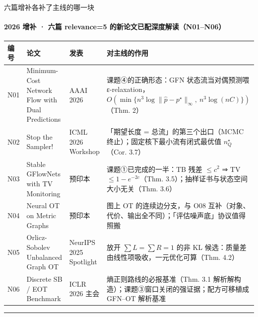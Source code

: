 \documentclass[aspectratio=169,10pt]{beamer}
\newcommand{\pos}[1]{\textcolor{positive}{#1}}
\newcommand{\con}[1]{\textcolor{negative}{#1}}
\begin{document}
\begin{frame}{六篇增补各补了主线的哪一块}\framesubtitle{2026 增补 · 六篇 relevance=5 的新论文已配深度解读（N01–N06）}
{\scriptsize\setlength{\tabcolsep}{3pt}\begin{tabular}{@{}>{\RaggedRight\arraybackslash}p{}>{\RaggedRight\arraybackslash}p{}>{\RaggedRight\arraybackslash}p{}>{\RaggedRight\arraybackslash}p{}@{}}\toprule
\textbf{编号} & \textbf{论文} & \textbf{发表} & \textbf{对主线的作用} \\\midrule
N01 & Minimum-Cost Network Flow with Dual Predictions & AAAI 2026 & 课题④的正确形态：GFN 状态流当对偶预测喂 ε-relaxation，$O(\min\{n^3\log\|\hat p-p^\star\|_\infty,\ n^3\log(nC)\})$（Thm. 2） \\\addlinespace[2pt]
N02 & Stop the Sampler! & ICML 2026 Workshop & 「期望长度 = 总流」的第三个出口（MCMC 终止）；固定核下最小流有闭式最优值 $n_Q^\star$（Cor. 3.7） \\\addlinespace[2pt]
N03 & Stable GFlowNets with TV Monitoring & 预印本 & \pos{课题①已完成的一半}：TB 残差 $\le c^2$ ⇒ TV $\le1-e^{-2c}$（Thm. 3.5）；抽样证书与状态空间大小无关（Thm. 3.6） \\\addlinespace[2pt]
N04 & Neural OT on Metric Graphs & 预印本 & 图上 OT 的连续边分支，与 O08 互补（对象、代价、输出全不同）；「评估噪声底」协议值得照搬 \\\addlinespace[2pt]
N05 & Orlicz-Sobolev Unbalanced Graph OT & NeurIPS 2025 Spotlight & 放开 $\sum L=\sum R=1$ 的非 KL 候选：质量差由线性项吸收，一元优化可算（Thm. 4.2） \\\addlinespace[2pt]
N06 & Discrete SB / EOT Benchmark & \con{ICLR 2026 主会} & 熵正则路线的必报基准（Thm. 3.1 解析解构造）；课题③窗口关闭的强证据；配方可移植成 GFN–OT 解析基准 \\\bottomrule\end{tabular}}
\vfill\hrule\vspace{2pt}{\footnotesize\textcolor{neutral}{六篇均已下载、DeepSeek 保版式中译（QA 2–11 issues）并写入 reports/N0*.md；N06 的发表状态由 PDF 页眉核实，趋势扫描阶段仅凭 arXiv comment 记为预印本是错的。}}
\end{frame}
\end{document}
